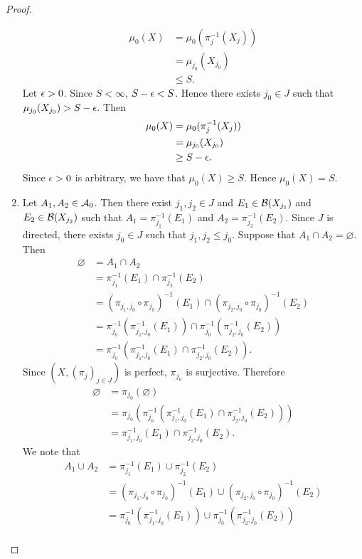 \documentclass{book}
\begin{document}
\begin{proof}
\begin{enumerate}
		\begin{align*}
			\mu_0(X) 
			& = \mu_0(\pi_j^{-1}(X_j)) \\
			& = \mu_{j_0}(X_{j_0}) \\
			& \leq S.
		\end{align*}
		Let $\epsilon > 0$. Since $S < \infty$, $S - \epsilon < S$. Hence there exists $j_0 \in J$ such that $\mu_{j_0}(X_{j_0}) > S - \epsilon$. Then 
		\begin{align*}
			\mu_0(X) 
			& = \mu_0(\pi_j^{-1}(X_j)) \\
			& = \mu_{j_0}(X_{j_0}) \\
			& \geq S - \epsilon.
		\end{align*}
		Since $\epsilon > 0$ is arbitrary, we have that $\mu_0(X) \geq S$. Hence $\mu_0(X) = S$.
		\item Let $A_1, A_2 \in \mathcal{A}_0$. Then there exist $j_1, j_2 \in J$ and $E_1 \in \mathcal{B}(X_{j_1})$ and $E_2 \in \mathcal{B}(X_{j_2})$ such that $A_1 = \pi_{j_1}^{-1}(E_1)$ and $A_2 = \pi_{j_2}^{-1}(E_2)$. Since $J$ is directed, there exists $j_0 \in J$ such that $j_1, j_2 \leq j_0$. Suppose that $A_1 \cap A_2 = \varnothing$. Then  
		\begin{align*}
			\varnothing
			& = A_1 \cap A_2 \\
			& = \pi_{j_1}^{-1}(E_1) \cap \pi_{j_2}^{-1}(E_2) \\
			& = (\pi_{j_1, j_0} \circ \pi_{j_0})^{-1}(E_1) \cap  (\pi_{j_2, j_0} \circ \pi_{j_0})^{-1}(E_2) \\
			& = \pi_{j_0}^{-1}(\pi_{j_1, j_0}^{-1}(E_1)) \cap \pi_{j_0}^{-1}(\pi_{j_2, j_0}^{-1}(E_2)) \\
			& = \pi_{j_0}^{-1}(\pi_{j_1, j_0}^{-1}(E_1) \cap \pi_{j_2, j_0}^{-1}(E_2)).
		\end{align*}	
		Since $(X, (\pi_j)_{j \in J})$ is perfect, $\pi_{j_0}$ is surjective. Therefore
		\begin{align*}
			\varnothing
			& = \pi_{j_0}(\varnothing) \\
			& = \pi_{j_0}(\pi_{j_0}^{-1}(\pi_{j_1, j_0}^{-1}(E_1) \cap \pi_{j_2, j_0}^{-1}(E_2))) \\
			& = \pi_{j_1, j_0}^{-1}(E_1) \cap \pi_{j_2, j_0}^{-1}(E_2).
		\end{align*}
		We note that 
		\begin{align*}
			A_1 \cup A_2
			& = \pi_{j_1}^{-1}(E_1) \cup \pi_{j_2}^{-1}(E_2) \\
			& = (\pi_{j_1, j_0} \circ \pi_{j_0})^{-1}(E_1) \cup  (\pi_{j_2, j_0} \circ \pi_{j_0})^{-1}(E_2) \\
			& = \pi_{j_0}^{-1}(\pi_{j_1, j_0}^{-1}(E_1)) \cup \pi_{j_0}^{-1}(\pi_{j_2, j_0}^{-1}(E_2)) \\

\end{align*}
\end{enumerate}
\end{proof}
\end{document}
